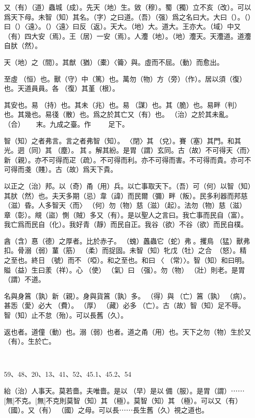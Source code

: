 \documentclass[a4paper]{ctexart}
\begin{document}
    又（有）（道）蟲城（成）。先天（地）生。敓（穆）。蜀（獨）立不亥（改）。可以爲天下母。未智（知）其名。（字）之曰道。（吾）（强）爲之名曰大。大曰（）。（）曰（）〈遠〉。（）〈遠〉曰反（返）。天大。（地）大。道大。王亦大。（域）中又（有）四大安（焉）。王（居）一安（焉）。人灋（地）。（地）灋天。天灋道。道灋自肰（然）。

    天（地）之（間）。其猷（猶）（橐）〈籥〉與。虛而不屈。（動）而愈出。

    至虛𠄨（恒）也。獸（守）中（篤）也。萬勿（物）方（旁）（作）。居以須（復）也。天道員員。各󵯿（復）其堇（根）。

    其安也。易𣏔（持）也。其未（兆）也。易𢘃（謀）也。其（脆）也。易畔（判）也。其幾也。易㣤（散）也。爲之於其亡又（有）也。𥿆（治）之於其未亂。𣌭（合）☐☐☐☐☐☐末。九成之臺。作☐☐☐☐☐☐☐☐☐足下。

    智（知）之者弗言。言之者弗智（知）。𨳮〈閉〉其𨓚（兌）。賽（塞）其門。和其光。迵（同）其󶴤（塵）。󶴤其󶩴。解其紛。是胃（謂）玄同。古（故）不可得天〈而〉新（親）。亦不可得而疋（疏）。不可得而利。亦不可得而害。不可得而貴。亦可不可得而戔（賤）。古（故）爲天下貴。

    以正之（治）邦。以（奇）甬（用）兵。以亡事取天下。（吾）可（何）以智（知）其肰（然）也。夫天多期（忌）韋（諱）而民爾（彌）畔（叛）。民多利器而邦慈（滋）昏。人多智天〈而〉𢦪（何）勿（物）慈（滋）（起）。法勿（物）慈（滋）章（彰）。覜（盜）惻（賊）多又（有）。是以聖人之言曰。我亡事而民自（富）。我亡爲而民自（化）。我好青（靜）而民自正。我谷（欲）不谷（欲）而民自樸。

    酓（含）惪（德）之厚者。比於赤子。󶵎（螝）䘍蟲它（蛇）弗𧍷。攫鳥󶵏（猛）獸弗扣。骨溺（弱）蓳（筋）󶵐（柔）而捉固。未智（知）牝戊（牡）之合󶵑󶵒（怒）。精之至也。終日󶴋（號）而不𪬐（啞）。和之至也。和曰󶵓〈󼲗（常）〉。智（知）和曰明。賹（益）生曰羕（祥）。心󶴎（使）󶴓（氣）曰󶴔（强）。勿（物）𡒉（壯）則老。是胃（謂）不道。

    名與身䈞（孰）新（親）。身與貨䈞（孰）多。󰴼（得）與󶵔（亡）䈞（孰）󶓄（病）。甚㤅（愛）必大󶵖（費）。󶵗（厚）󶤖（藏）必多󶵔（亡）。古（故）智（知）足不辱。智（知）止不怠（殆）。可以長舊（久）。

    返也者。道僮（動）也。溺（弱）也者。道之甬（用）也。天下之勿（物）生於又（有）。生於亡。

    𣏔（持）而浧（盈）之。不不若已。湍而群之。不可長保也。金玉浧（盈）室。莫能獸（守）也。貴（富）喬（驕）。自遺咎也。攻（功）述（遂）身退。天之道也。

    59、48、20、13、41、52、45.1、45.2、54

    紿（治）人事天。莫若嗇。夫唯嗇。是以󶵙（早）是以󶵙備（服）。是胃（謂）⋯⋯[無]不克。[無]不克則莫智（知）其𠄨（極）。莫智（知）其𠄨（極）。可以又（有）󼷜（國）。又（有）󼷜（國）之母。可以長⋯⋯長生舊（久）視之道也。
\end{document}

